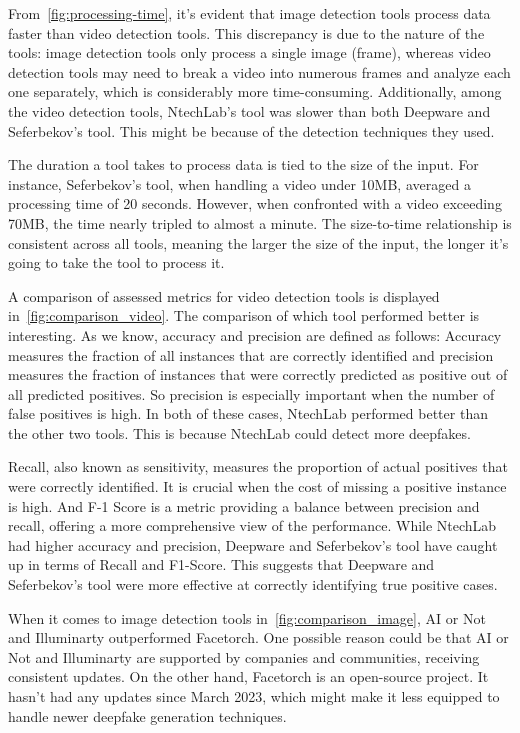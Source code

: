 From~\autoref{fig:processing-time}, it's evident that image detection tools process data faster
than video detection tools. This discrepancy is due to the nature of the tools:
image detection tools only process a single image (frame), whereas video detection tools may
need to break a video into numerous frames and analyze each one separately, which is considerably
more time-consuming. Additionally, among the video detection tools, NtechLab's tool was slower than
both Deepware and Seferbekov's tool. This might be because of the detection techniques they used.

The duration a tool takes to process data is tied to the size of the input. For instance,
Seferbekov's tool, when handling a video under 10MB, averaged a processing time of 20 seconds. However,
when confronted with a video exceeding 70MB, the time nearly tripled to almost a minute.
The size-to-time relationship is consistent across all tools, meaning the larger the size of the
input, the longer it's going to take the tool to process it.

A comparison of assessed metrics for video detection tools is displayed in~\autoref{fig:comparison_video}.
The comparison of which tool performed better is interesting. As we know, accuracy and precision
are defined as follows: Accuracy measures the fraction of all instances that are correctly
identified and precision measures the fraction of instances that were correctly predicted as
positive out of all predicted positives. So precision is especially important when the number
of false positives is high. In both of these cases, NtechLab performed better than the other two
tools. This is because NtechLab could detect more deepfakes.

Recall, also known as sensitivity, measures the proportion of actual positives that were
correctly identified. It is crucial when the cost of missing a positive instance is high.
And F-1 Score is a metric providing a balance between precision and recall, offering a more
comprehensive view of the performance. While NtechLab had higher accuracy and precision,
Deepware and Seferbekov's tool have caught up in terms of Recall and F1-Score. This suggests that
Deepware and Seferbekov's tool were more effective at correctly identifying true positive cases.

When it comes to image detection tools in~\autoref{fig:comparison_image}, AI or Not and
Illuminarty outperformed Facetorch. One possible reason could be that AI or Not and
Illuminarty are supported by companies and communities, receiving consistent updates.
On the other hand, Facetorch is an open-source project. It hasn't had any updates
since March 2023, which might make it less equipped to handle newer deepfake generation
techniques.

